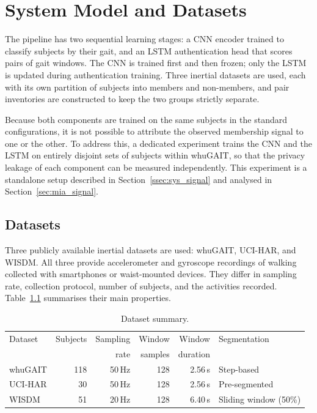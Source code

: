 \chapter{System Model and Datasets}
\label{ch:system}

The pipeline has two sequential learning stages: a CNN encoder trained to classify subjects by their gait, and an LSTM authentication head that scores pairs of gait windows. The CNN is trained first and then frozen; only the LSTM is updated during authentication training. Three inertial datasets are used, each with its own partition of subjects into members and non-members, and pair inventories are constructed to keep the two groups strictly separate.

Because both components are trained on the same subjects in the standard configurations, it is not possible to attribute the observed membership signal to one or the other. To address this, a dedicated experiment trains the CNN and the LSTM on entirely disjoint sets of subjects within whuGAIT, so that the privacy leakage of each component can be measured independently. This experiment is a standalone setup described in Section~\ref{ssec:sys_signal} and analysed in Section~\ref{sec:mia_signal}.

\section{Datasets}
\label{sec:sys_datasets}

Three publicly available inertial datasets are used: whuGAIT, UCI-HAR, and WISDM. All three provide accelerometer and gyroscope recordings of walking collected with smartphones or waist-mounted devices. They differ in sampling rate, collection protocol, number of subjects, and the activities recorded. Table~\ref{tab:datasets} summarises their main properties.

\begin{table}[htbp]
\centering
\caption{Dataset summary.}
\label{tab:datasets}
\begin{tabular}{lrrrrl}
\toprule
Dataset  & Subjects & Sampling & Window    & Window    & Segmentation \\
         &          & rate     & samples   & duration  & \\
\midrule
whuGAIT  & 118      & 50\,Hz   & 128       & 2.56\,s   & Step-based \\
UCI-HAR  & 30       & 50\,Hz   & 128       & 2.56\,s   & Pre-segmented \\
WISDM    & 51       & 20\,Hz   & 128       & 6.40\,s   & Sliding window (50\%) \\
\bottomrule
\end{tabular}
\end{table}

